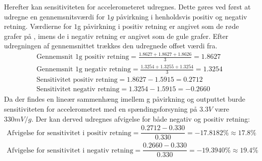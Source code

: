\noindent Herefter kan sensitiviteten for accelerometeret udregnes. Dette gøres ved først at udregne en gennemsnitsværdi for $1g$ påvirkning i henholdsvis positiv og negativ retning. Værdierne for $1$g påvirkning i positiv retning er angivet som de røde grafer på , imens de i negativ retning er angivet som de gule grafer. Efter udregningen af gennemsnittet trækkes den udregnede offset værdi fra.
\begin{align}
	\text{Gennemsnit 1g positiv retning} = \frac{1.8627 + 1.8627 + 1.8626}{3} = 1.8627 \\
	\text{Gennemsnit 1g negativ retning} = \frac{1.3254 + 1.3255 + 1.3254}{3} = 1.3254 \\
	\text{Sensitivitet positiv retning} = 1.8627 - 1.5915 = 0.2712 \\
	\text{Sensitivitet negativ retning} = 1.3254 - 1.5915 = -0.2660
\end{align}
\noindent Da der findes en lineær sammenhæng imellem g påvirkning og outputtet burde sensitiviteten for accelerometret med en spændingsforsyning på $3.3V$ være $330mV/g$. Der kan derved udregnes afvigelse for både negativ og positiv retning:
\begin{align}
	\text{Afvigelse for sensitivitet i positiv retning} = \dfrac{0.2712 - 0.330}{0.330} = -17.8182\% \approx 17.8\% \\
	\text{Afvigelse for sensitivitet i negativ retning} = \dfrac{0.2660 - 0.330}{0.330} = -19.3940\% \approx 19.4\%
\end{align}

